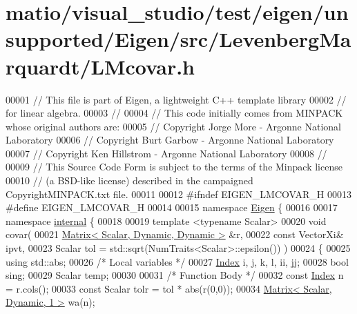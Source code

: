 \hypertarget{matio_2visual__studio_2test_2eigen_2unsupported_2_eigen_2src_2_levenberg_marquardt_2_l_mcovar_8h_source}{}\section{matio/visual\+\_\+studio/test/eigen/unsupported/\+Eigen/src/\+Levenberg\+Marquardt/\+L\+Mcovar.h}
\label{matio_2visual__studio_2test_2eigen_2unsupported_2_eigen_2src_2_levenberg_marquardt_2_l_mcovar_8h_source}

\begin{DoxyCode}
00001 \textcolor{comment}{// This file is part of Eigen, a lightweight C++ template library}
00002 \textcolor{comment}{// for linear algebra.}
00003 \textcolor{comment}{//}
00004 \textcolor{comment}{// This code initially comes from MINPACK whose original authors are:}
00005 \textcolor{comment}{// Copyright Jorge More - Argonne National Laboratory}
00006 \textcolor{comment}{// Copyright Burt Garbow - Argonne National Laboratory}
00007 \textcolor{comment}{// Copyright Ken Hillstrom - Argonne National Laboratory}
00008 \textcolor{comment}{//}
00009 \textcolor{comment}{// This Source Code Form is subject to the terms of the Minpack license}
00010 \textcolor{comment}{// (a BSD-like license) described in the campaigned CopyrightMINPACK.txt file.}
00011 
00012 \textcolor{preprocessor}{#ifndef EIGEN\_LMCOVAR\_H}
00013 \textcolor{preprocessor}{#define EIGEN\_LMCOVAR\_H}
00014 
00015 \textcolor{keyword}{namespace }\hyperlink{namespace_eigen}{Eigen} \{ 
00016 
00017 \textcolor{keyword}{namespace }\hyperlink{namespaceinternal}{internal} \{
00018 
00019 \textcolor{keyword}{template} <\textcolor{keyword}{typename} Scalar>
00020 \textcolor{keywordtype}{void} covar(
00021         \hyperlink{group___core___module}{Matrix< Scalar, Dynamic, Dynamic >} &r,
00022         \textcolor{keyword}{const} VectorXi& ipvt,
00023         Scalar tol = std::sqrt(NumTraits<Scalar>::epsilon()) )
00024 \{
00025     \textcolor{keyword}{using} std::abs;
00026     \textcolor{comment}{/* Local variables */}
00027     \hyperlink{namespace_eigen_a62e77e0933482dafde8fe197d9a2cfde}{Index} i, j, k, l, ii, jj;
00028     \textcolor{keywordtype}{bool} sing;
00029     Scalar temp;
00030 
00031     \textcolor{comment}{/* Function Body */}
00032     \textcolor{keyword}{const} \hyperlink{namespace_eigen_a62e77e0933482dafde8fe197d9a2cfde}{Index} n = r.cols();
00033     \textcolor{keyword}{const} Scalar tolr = tol * abs(r(0,0));
00034     \hyperlink{group___core___module}{Matrix< Scalar, Dynamic, 1 >} wa(n);

\end{DoxyCode}
